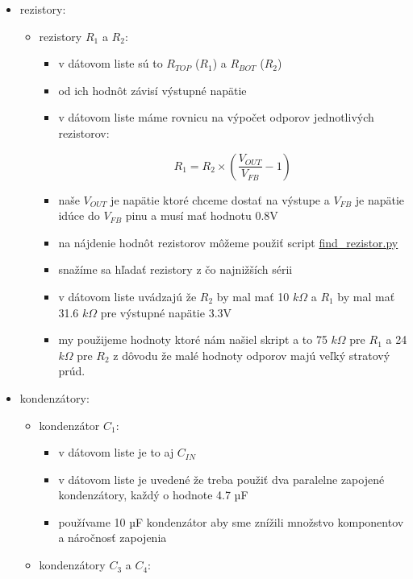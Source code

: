 \documentclass[12pt, twoside]{book}
\begin{document}
\begin{itemize}

\item 
    rezistory: 
    \begin{itemize}
        \item 
        rezistory $R_1$ a $R_2$:
        \begin{itemize}
            \item 
            v dátovom liste sú to $R_{TOP}$ ($R_1$) a $R_{BOT}$ ($R_2$)
            \item 
            od ich hodnôt závisí výstupné napätie
            \item 
            v dátovom liste máme rovnicu na výpočet odporov jednotlivých rezistorov:

            \begin{equation}
                    R_{1} = R_{2} \times \left(\frac{V_{OUT}}{V_{FB}} - 1\right)
            \end{equation}
            \item
            naše $V_{OUT}$ je napätie ktoré chceme dostať na výstupe a $V_{FB}$ je napätie idúce do $V_{FB}$ pinu a musí mať hodnotu 0.8V
            \item 
            na nájdenie hodnôt rezistorov môžeme použiť script \href{https://github.com/ostertag/UACS/tree/hardwear_kozuch/power_suply_shc_1/find_rezistor}{find\_rezistor.py}
            \item 
            snažíme sa hľadať rezistory z čo najnižších sérii
            \item 
            v dátovom liste uvádzajú že $R_2$ by mal mať 10 $k\Omega$ a $R_1$ by mal mať 31.6 $k\Omega$ pre výstupné napätie 3.3V
            \item 
            my použijeme hodnoty ktoré nám našiel skript a to 75 $k\Omega$ pre $R_1$  a 24 $k\Omega$ pre $R_2$ z dôvodu že malé hodnoty odporov majú veľký stratový prúd.  
        \end{itemize}
    \end{itemize}
\item
  kondenzátory:

  \begin{itemize}
  \item
    kondenzátor $C_1$:

    \begin{itemize}
    
    \item
      v dátovom liste je to aj $C_{IN}$
    \item
      v dátovom liste je uvedené že treba použiť dva paralelne zapojené
      kondenzátory, každý o hodnote 4.7 µF
    \item
      používame 10 µF kondenzátor aby sme znížili množstvo komponentov a
      náročnosť zapojenia
    \end{itemize}
  \item
    kondenzátory $C_3$ a $C_4$:


\end{itemize}
\end{itemize}
\end{document}
